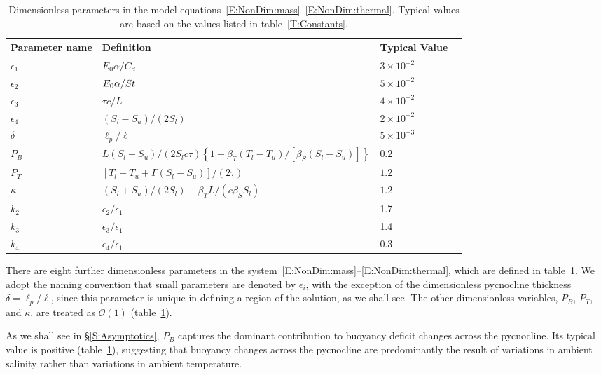 \documentclass[openacc]{rsproca_new}%
\newcommand{\order}[1]{\mathcal{O}(#1)}
\newcommand{\blue}[1]{{\color{blue} #1}}
\renewcommand{\blue}[1]{{\textcolor{black}{#1}}} %
\newcommand{\epsone}{\epsilon_{1}} %
\newcommand{\epstwo}{\epsilon_{2}} %
\newcommand{\epsthree}{\epsilon_{3}} %
\newcommand{\epsfour}{\epsilon_{4}}
\newcommand{\Pb}{\textit{P}_B}  %
\newcommand{\lt}{\delta} %
\newcommand{\Pt}{\textit{P}_T}
\begin{document}
\begin{table}[!h]
\caption{Dimensionless parameters in the model equations~\eqref{E:NonDim:mass}--\eqref{E:NonDim:thermal}. Typical values are based on the values listed in table~\ref{T:Constants}.}\label{T:Dimensionless_Parameters}
\begin{center}
\begin{tabular}{llll}
Parameter name  & Definition   & Typical Value \\
\hline 
\vspace{2pt}
$\epsone$ & $  E_0 \alpha /C_d $  &$ 3 \times 10^{-2}$ \\
$\epstwo$ & $  E_0 \alpha \blue{/}St $ & $ 5 \times 10^{-2}$ \\
$\epsthree$ & $  \tau c / L $ & $ 4 \times 10^{-2}$ \\
$\epsfour$ & $  (S_l - S_u)/(2 S_l) $  &$ 2 \times 10^{-2}$ \\
$\lt$ & $  \ell_p / \ell $ & $  5 \times 10^{-3}$ \\
$\Pb$ & $  L (S_l - S_u)/(2S_l c \tau)\left\{1 - \beta_T (T_l - T_u)/\left[\beta_S (S_l - S_u)\right]\right\}$   & $  0.2$ \\
$\Pt$ & $ \left[T_l - T_u + \Gamma( S_l - S_u)\right]/(2 \tau)$ & $  1.2$ \\
$\kappa$ & $ (S_l + S_u)/(2S_l) -  \beta_T L / (c \beta_S S_l)$ &  $  1.2$ \\
\hline
$k_2$ & $\epstwo/\epsone$ & 1.7\\
$k_3$ & $\epsthree / \epsone$ & 1.4\\
$k_4$ & $\epsfour/ \epsone$ & 0.3\\
\end{tabular}
\end{center}
\end{table}
 
There are eight further dimensionless parameters in the system~\eqref{E:NonDim:mass}--\eqref{E:NonDim:thermal}, which are defined in table~\ref{T:Dimensionless_Parameters}. We adopt the naming convention that small parameters are denoted by $\epsilon_i$, with the exception of the dimensionless pycnocline thickness $\delta = \ell_p / \ell$, since this parameter is unique in defining a region of the solution, as we shall see. The other dimensionless variables, $\Pb$, $\Pt$, and $\kappa$, are treated as $\order{1}$ (table~\ref{T:Dimensionless_Parameters}).

As we shall see in \S\ref{S:Asymptotics}, $\Pb$ captures the dominant contribution to buoyancy deficit changes across the pycnocline. Its typical value is positive (table~\ref{T:Dimensionless_Parameters}), suggesting that buoyancy changes across the pycnocline are predominantly the result of variations in ambient salinity rather than variations in ambient temperature.
\end{document}
